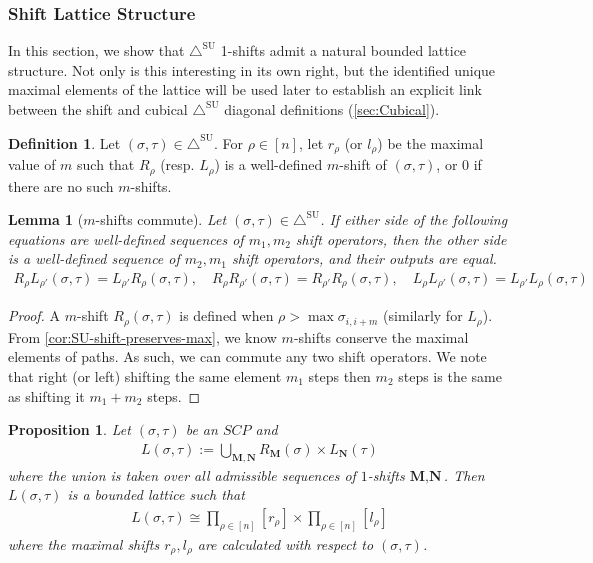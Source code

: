 \documentclass{amsart}
\newtheorem{proposition}[theorem]{Proposition}
\newtheorem{lemma}[theorem]{Lemma}
\theoremstyle{definition}
\newtheorem{definition}[theorem]{Definition}
\newcommand{\SUD}{\triangle^{\mathrm{SU}}}
\begin{document}

\subsubsection{Shift Lattice Structure}

In this section, we show that $\SUD$ 1-shifts admit a natural bounded lattice structure.
Not only is this interesting in its own right, but the identified unique maximal elements of the lattice will be used later to establish an explicit link between the shift and cubical $\SUD$ diagonal definitions (\cref{sec:Cubical}).

\begin{definition}
Let $(\sigma,\tau) \in \SUD$. For $\rho \in [n]$, let $r_\rho$ (or $l_\rho$) be the maximal value of $m$ such that $R_\rho$ (resp. $L_\rho$) is a well-defined $m$-shift of $(\sigma,\tau)$, or $0$ if there are no such $m$-shifts.

\end{definition}

\begin{lemma}[$m$-shifts commute] \label{lem:m-shifts commute}
Let $(\sigma,\tau) \in \SUD$.
If either side of the following equations are  well-defined sequences of $m_1,m_2$ shift operators, then the other side is a well-defined sequence of $m_2,m_1$ shift operators, and their outputs are equal.
\begin{align*}
    R_{\rho} L_{\rho'}(\sigma,\tau) = L_{\rho'} R_{\rho}(\sigma,\tau), \quad R_{\rho} R_{\rho'}(\sigma,\tau) = R_{\rho'} R_{\rho}(\sigma,\tau), \quad L_{\rho} L_{\rho'}(\sigma,\tau) = L_{\rho'} L_{\rho}(\sigma,\tau)
\end{align*}
\end{lemma}
\begin{proof}
A $m$-shift $R_{\rho}(\sigma,\tau)$ is defined when $\rho > \max \sigma_{i,i+m}$ (similarly for $L_{\rho}$).
From \cref{cor:SU-shift-preserves-max}, we know $m$-shifts conserve the maximal elements of paths. 
As such, we can commute any two shift operators.
We note that right (or left) shifting the same element $m_1$ steps then $m_2$ steps is the same as shifting it $m_1+m_2$ steps.
\end{proof}

\begin{proposition} \label{prop:shift lattice}
Let $(\sigma,\tau)$ be an $SCP$ and 
\begin{align*}
    L(\sigma,\tau) := \bigcup_{\mathbf{M}, \mathbf{N}} R_\mathbf{M}(\sigma)\times L_\mathbf{N}(\tau)
\end{align*}
where the union is taken over all admissible sequences of $1$-shifts $\textbf{M},\textbf{N}$. 
Then $L(\sigma,\tau)$ is a bounded lattice such that
\begin{align*}
    L(\sigma,\tau) \cong \prod_{\rho \in [n]} [r_\rho]
    \times \prod_{\rho \in [n]} [l_\rho]
\end{align*}
where the maximal shifts $r_\rho,l_\rho$ are calculated with respect to $(\sigma,\tau)$.
\end{proposition}
\end{document}
